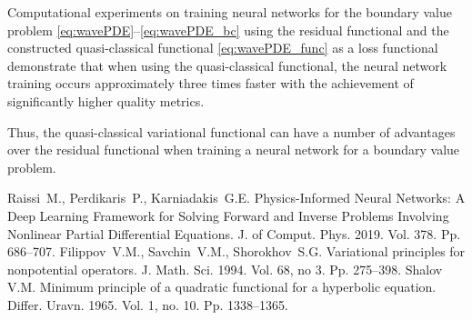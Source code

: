 \documentclass[12pt]{llncs}
\begin{document}
Computational experiments on training neural networks for the boundary value problem \eqref{eq:wavePDE}--\eqref{eq:wavePDE_bc} using the residual functional and the constructed quasi-classical functional \eqref{eq:wavePDE_func} as a loss functional demonstrate that when using the quasi-classical functional, the neural network training occurs approximately three times faster with the achievement of significantly higher quality metrics.

Thus, the quasi-classical variational functional can have a number of advantages over the residual functional when training a neural network for a boundary value problem.


%


\begin{thebibliography}{9} %
 Raissi~M., Perdikaris~P., Karniadakis~G.E. Physics-Informed Neural Networks: A Deep Learning Framework for Solving Forward and Inverse Problems Involving Nonlinear Partial Differential Equations. J. of Comput. Phys. 2019. Vol. 378. Pp. 686--707.
 Filippov~V.M., Savchin~V.M., Shorokhov~S.G. Variational principles for nonpotential operators. J. Math. Sci. 1994. Vol. 68, no 3. Pp. 275--398.
 Shalov V.M.  Minimum principle of a quadratic functional for a hyperbolic equation. Differ. Uravn. 1965. Vol. 1, no. 10.  Pp. 1338--1365.
\end{thebibliography}

\end{document}
